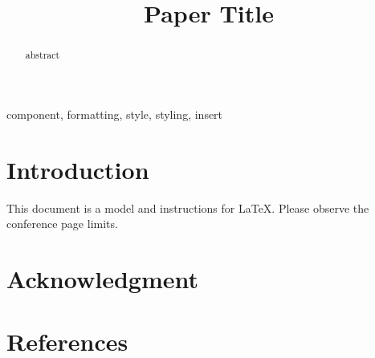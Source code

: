 \documentclass[conference]{IEEEtran}
\begin{document}
\title{Paper Title}

\author{
\and
{}
\and
{}
\and
{}
}

\maketitle

\begin{abstract}
abstract
\end{abstract}

\begin{IEEEkeywords}
component, formatting, style, styling, insert
\end{IEEEkeywords}

\section{Introduction}
This document is a model and instructions for \LaTeX.
Please observe the conference page limits. 

\section*{Acknowledgment}


\section*{References}

\cite{koenig2002improved}



\end{document}
